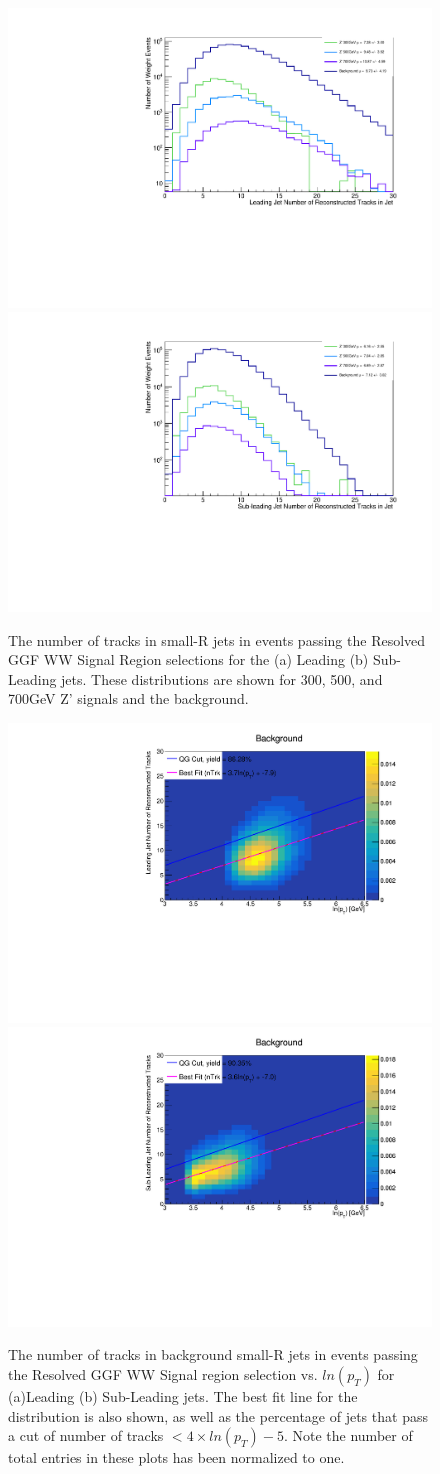 \begin{figure}[h!]
  \centering
  \includegraphics[width=0.45\hsize]{figures/QGT/sigWJ1_nTrk_Pass_Res_GGF_WW_SR.pdf}
 \includegraphics[width=0.45\hsize]{figures/QGT/sigWJ2_nTrk_Pass_Res_GGF_WW_SR.pdf}
  \caption{The number of tracks in small-R jets in events passing the Resolved GGF WW Signal Region selections for the (a) Leading (b) Sub-Leading jets. These distributions are shown for 300, 500, and 700GeV Z' signals and the background.}
  \label{fig:diag_ntrk}
\end{figure}
\FloatBarrier


\begin{figure}[h!]
  \centering
  \includegraphics[width=0.45\hsize]{figures/QGT/allbkg-ade_Pass_Res_GGF_WW_SR_sigWJ1_nTrk.pdf}
 \includegraphics[width=0.45\hsize]{figures/QGT/allbkg-ade_Pass_Res_GGF_WW_SR_sigWJ2_nTrk.pdf}
  \caption{The number of tracks in background small-R jets in events passing the Resolved GGF WW Signal region selection vs. $ln(p_{T})$ for (a)Leading (b) Sub-Leading jets. The best fit line for the distribution is also shown, as well as the percentage of jets that pass a cut of number of tracks $< 4\times ln(p_{T}) -5$. Note the number of total entries in these plots has been normalized to one.}
  \label{fig:bkg_heatmap}
\end{figure}
\FloatBarrier


